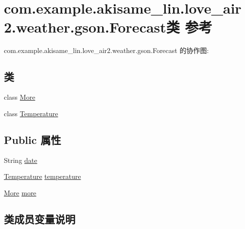 \hypertarget{classcom_1_1example_1_1akisame__lin_1_1love__air2_1_1weather_1_1gson_1_1_forecast}{}\section{com.\+example.\+akisame\+\_\+lin.\+love\+\_\+air2.\+weather.\+gson.\+Forecast类 参考}
\label{classcom_1_1example_1_1akisame__lin_1_1love__air2_1_1weather_1_1gson_1_1_forecast}


com.\+example.\+akisame\+\_\+lin.\+love\+\_\+air2.\+weather.\+gson.\+Forecast 的协作图\+:
\subsection*{类}
\begin{DoxyCompactItemize}
\item 
class \mbox{\hyperlink{classcom_1_1example_1_1akisame__lin_1_1love__air2_1_1weather_1_1gson_1_1_forecast_1_1_more}{More}}
\item 
class \mbox{\hyperlink{classcom_1_1example_1_1akisame__lin_1_1love__air2_1_1weather_1_1gson_1_1_forecast_1_1_temperature}{Temperature}}
\end{DoxyCompactItemize}
\subsection*{Public 属性}
\begin{DoxyCompactItemize}
\item 
String \mbox{\hyperlink{classcom_1_1example_1_1akisame__lin_1_1love__air2_1_1weather_1_1gson_1_1_forecast_a7ba6f2db1b31bc338a49fcea7156750f}{date}}
\item 
\mbox{\hyperlink{classcom_1_1example_1_1akisame__lin_1_1love__air2_1_1weather_1_1gson_1_1_forecast_1_1_temperature}{Temperature}} \mbox{\hyperlink{classcom_1_1example_1_1akisame__lin_1_1love__air2_1_1weather_1_1gson_1_1_forecast_a0f3dab78555346c13bf90a1e0e5d1f25}{temperature}}
\item 
\mbox{\hyperlink{classcom_1_1example_1_1akisame__lin_1_1love__air2_1_1weather_1_1gson_1_1_forecast_1_1_more}{More}} \mbox{\hyperlink{classcom_1_1example_1_1akisame__lin_1_1love__air2_1_1weather_1_1gson_1_1_forecast_afb279bf0c7a9a5cde770da000a658ce2}{more}}
\end{DoxyCompactItemize}


\subsection{类成员变量说明}
\mbox{\label{classcom_1_1example_1_1akisame__lin_1_1love__air2_1_1weather_1_1gson_1_1_forecast_a7ba6f2db1b31bc338a49fcea7156750f}} 
